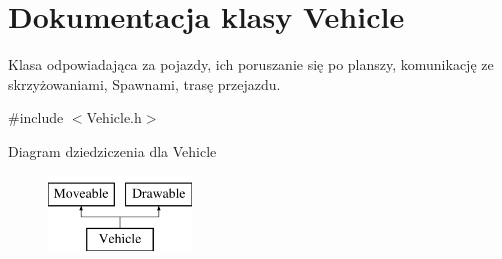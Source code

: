\hypertarget{class_vehicle}{\section{Dokumentacja klasy Vehicle}
\label{class_vehicle}
}


Klasa odpowiadająca za pojazdy, ich poruszanie się po planszy, komunikację ze skrzyżowaniami, Spawnami, trasę przejazdu.  




{\ttfamily \#include $<$Vehicle.\-h$>$}

Diagram dziedziczenia dla Vehicle\begin{figure}[H]
\begin{center}
\leavevmode
\includegraphics[height=2.000000cm]{class_vehicle}
\end{center}
\end{figure}
